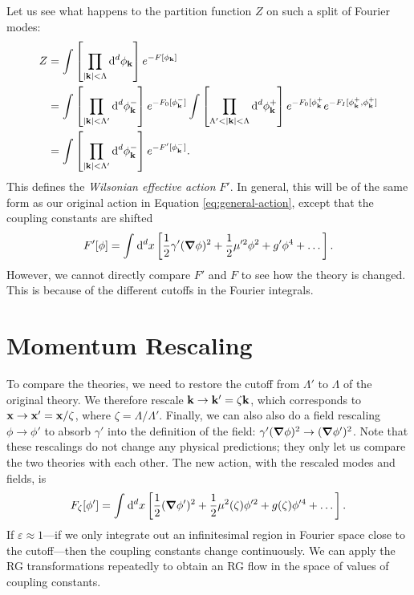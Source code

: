 Let us see what happens to the partition function $Z$ on such a split of Fourier modes:
\begin{align}
  Z &= \int \left[\prod_{\abs{\vb{k}}< \Lambda} \dd[d]{\phi_{\vb{k}}}\right] e^{-F[\phi_{\vb{k}}]} \\
    &= \int \left[\prod_{\abs{\vb{k}}< \Lambda'} \dd[d]{\phi^-_{\vb{k}}}\right] e^{-F_0[\phi^-_{\vb{k}}]}
    \int \left[ \prod_{\Lambda' < \abs{\vb{k}} < \Lambda} \dd[d]{\phi^+_{\vb{k}}} \right] e^{-F_0[\phi^+_{\vb{k}}} e^{-F_I [\phi^+_{\vb{k}}, \phi^+_{\vb{k}}]}\\
    &= \int \left[ \prod_{\abs{\vb{k}} < \Lambda'} \dd[d]{\phi^-_{\vb{k}}} \right] e^{-F'[\phi^-_{\vb{k}}]}.
\end{align}
This defines the \emph{Wilsonian effective action} $F'$. In general, this will be of the same form as our original action in Equation \eqref{eq:general-action}, except that the coupling constants are shifted
\begin{equation}
  F'[\phi] = \int_{}^{} \dd[d]{x} \left[ \frac{1}{2} \gamma'(\grad \phi)^2 + \frac{1}{2} \mu'^2 \phi^2 + g' \phi^4 + \dots \right].
\end{equation}
However, we cannot directly compare $F'$ and $F$ to see how the theory is changed. This is because of the different cutoffs in the Fourier integrals.

\section{Momentum Rescaling}%
\label{sec:momentum_rescaling}

To compare the theories, we need to restore the cutoff from $\Lambda'$ to $\Lambda$ of the original theory.
We therefore rescale $\vb{k} \to \vb{k}' = \zeta \vb{k}$, which corresponds to $\vb{x} \to \vb{x}' = \vb{x} / \zeta$, where $\zeta = \Lambda / \Lambda'$.
Finally, we can also also do a field rescaling $\phi \to \phi'$ to absorb $\gamma'$ into the definition of the field: $\gamma' (\grad \phi)^2 \to (\grad \phi')^2$.
Note that these rescalings do not change any physical predictions; they only let us compare the two theories with each other.
The new action, with the rescaled modes and fields, is
\begin{equation}
  F_{\zeta} [\phi'] = \int_{}^{} \dd[d]{x} \left[ \frac{1}{2} (\grad \phi')^2 + \frac{1}{2} \mu^2(\zeta) \phi'^2 + g(\zeta) \phi'^4 + \dots \right].
\end{equation}
If $\varepsilon \approx 1$---if we only integrate out an infinitesimal region in Fourier space close to the cutoff---then the coupling constants change continuously. We can apply the RG transformations repeatedly to obtain an RG flow in the space of values of coupling constants.

